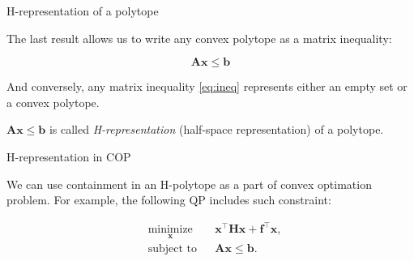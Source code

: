 \documentclass{beamer}
\begin{document}
\begin{frame}{H-representation of a polytope}
\begin{flushleft}

The last result allows us to write any convex polytope as a matrix inequality:

\begin{equation}
\label{eq:ineq} 
    \mathbf{A} \mathbf{x} \leq  \mathbf{b} 
\end{equation}

And conversely, any matrix inequality \eqref{eq:ineq} represents either an empty set or a convex polytope.

\bigskip

\begin{definition}
 $\mathbf{A} \mathbf{x} \leq  \mathbf{b}$ is called \emph{H-representation} (half-space representation) of a polytope.
\end{definition}
 
\end{flushleft}
\end{frame}



\begin{frame}{H-representation in COP}
	\begin{flushleft}
		
		We can use containment in an H-polytope as a part of convex optimation problem. For example, the following QP includes such constraint:
		
		\begin{equation}
			\begin{aligned}
				& \underset{\mathbf{x}}{\text{minimize}}
				& & \mathbf{x}^\top \mathbf{H} \mathbf{x} + \mathbf{f}^\top\mathbf{x}, \\
				& \text{subject to}
				& & \mathbf{A}\mathbf{x} \leq \mathbf{b}.
			\end{aligned}
		\end{equation}
		
	\end{flushleft}
\end{frame}
\end{document}
